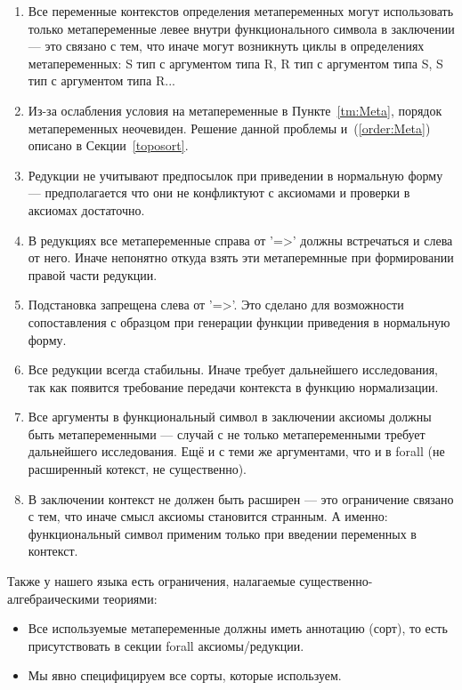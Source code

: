 \begin{enumerate}
\item \label{order:Meta} Все переменные контекстов определения метапеременных могут использовать только метапеременные левее внутри функционального символа в заключении --- это связано с тем, что иначе могут возникнуть циклы в определениях метапеременных: S тип с аргументом типа R, R тип с аргументом типа S, S тип с аргументом типа R...

\item Из-за ослабления условия на метапеременные в Пункте~\ref{tm:Meta}, порядок метапеременных неочевиден. Решение данной проблемы и~(\ref{order:Meta}) описано в Секции~\ref{toposort}.

\item Редукции не учитывают предпосылок при приведении в нормальную форму --- предполагается что они не конфликтуют с аксиомами и проверки в аксиомах достаточно.

\item В редукциях все метапеременные справа от '=>' должны встречаться и слева от него. Иначе непонятно откуда взять эти метаперемнные при формировании правой части редукции.

\item Подстановка запрещена слева от '=>'. Это сделано для возможности сопоставления с образцом при генерации функции приведения в нормальную форму.

\item Все редукции всегда стабильны. Иначе требует дальнейшего исследования, так как появится требование передачи контекста в функцию нормализации.

\item Все аргументы в функциональный символ в заключении аксиомы должны быть метапеременными --- случай с не только метапеременными требует дальнейшего исследования. Ещё и с теми же аргументами, что и в forall (не расширенный котекст, не существенно).

\item В заключении контекст не должен быть расширен --- это ограничение связано с тем, что иначе смысл аксиомы становится странным. А именно: функциональный символ применим только при введении переменных в контекст.

\end{enumerate}

Также у нашего языка есть ограничения, налагаемые существенно-алгебраическими теориями:
\begin{itemize}
\item Все используемые метапеременные должны иметь аннотацию (сорт), то есть присутствовать в секции forall аксиомы/редукции.
\item Мы явно специфицируем все сорты, которые используем.
\end{itemize}

